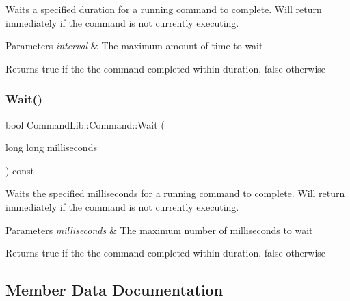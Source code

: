 Waits a specified duration for a running command to complete. Will return immediately if the command is not currently executing. 


\begin{DoxyParams}{Parameters}
{\em interval} & The maximum amount of time to wait\\
\hline
\end{DoxyParams}
\begin{DoxyReturn}{Returns}
true if the the command completed within \textquotesingle{}duration\textquotesingle{}, false otherwise
\end{DoxyReturn}
\mbox{\label{class_command_lib_1_1_command_ad4cae3ab883426e4f872782b8de88597}} 
\subsubsection{\texorpdfstring{Wait()}{Wait()}\hspace{0.1cm}{\footnotesize\ttfamily [3/3]}}
{\footnotesize\ttfamily bool Command\+Lib\+::\+Command\+::\+Wait (\begin{DoxyParamCaption}\item[{long long}]{milliseconds }\end{DoxyParamCaption}) const}



Waits the specified milliseconds for a running command to complete. Will return immediately if the command is not currently executing. 


\begin{DoxyParams}{Parameters}
{\em milliseconds} & The maximum number of milliseconds to wait\\
\hline
\end{DoxyParams}
\begin{DoxyReturn}{Returns}
true if the the command completed within \textquotesingle{}duration\textquotesingle{}, false otherwise
\end{DoxyReturn}


\subsection{Member Data Documentation}
\mbox{\label{class_command_lib_1_1_command_aa4ceb8d85a720bc5d9bac4be3afd7df5}} 
